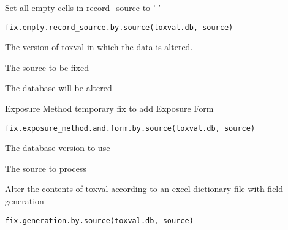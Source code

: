 \documentclass[letterpaper]{book}
\begin{document}
\begin{Description}\relax
Set all empty cells in record\_source to '-'
\end{Description}
%
\begin{Usage}
\begin{verbatim}
fix.empty.record_source.by.source(toxval.db, source)
\end{verbatim}
\end{Usage}
%
\begin{Arguments}
\begin{ldescription}
\item[\code{toxval.db}] The version of toxval in which the data is altered.

\item[\code{source}] The source to be fixed
\end{ldescription}
\end{Arguments}
%
\begin{Value}
The database will be altered
\end{Value}
%
\begin{Description}\relax
Exposure Method temporary fix to add Exposure Form
\end{Description}
%
\begin{Usage}
\begin{verbatim}
fix.exposure_method.and.form.by.source(toxval.db, source)
\end{verbatim}
\end{Usage}
%
\begin{Arguments}
\begin{ldescription}
\item[\code{toxval.db}] The database version to use

\item[\code{source}] The source to process
\end{ldescription}
\end{Arguments}
%
\begin{Description}\relax
Alter the contents of toxval according to an excel dictionary file with field generation
\end{Description}
%
\begin{Usage}
\begin{verbatim}
fix.generation.by.source(toxval.db, source)
\end{verbatim}
\end{Usage}
\end{document}
